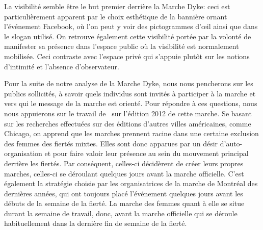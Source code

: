 La visibilité semble être le but premier derrière la Marche Dyke: ceci est particulièrement apparent par le choix esthétique de la bannière ornant l'événement Facebook, où l'on peut y voir des pictogrammes d'œil ainsi que dans le slogan utilisé.
On retrouve également cette visibilité portée par la volonté de manifester sa présence dans l'espace public où la visibilité est normalement mobilisée.
Ceci contraste avec l'espace privé qui s'appuie plutôt sur les notions d'intimité et l'absence d'observateur.

Pour la suite de notre analyse de la Marche Dyke, nous nous pencherons sur les publics sollicités, à savoir quels individus sont invités à participer à la marche et vers qui le message de la marche est orienté.
Pour répondre à ces questions, nous nous appuierons sur le travail de~\cite{Podmore2015a} sur l'édition 2012 de cette marche.
Se basant sur les recherches effectuées sur des éditions d'autres villes américaines, comme Chicago, on apprend que les marches \dykes{} prennent racine dans une certaine exclusion des femmes des fiertés mixtes.
Elles sont donc apparues par un désir d'auto-organisation et pour faire valoir leur présence au sein du mouvement principal derrière les fiertés.
Par conséquent, celles-ci décidèrent de créer leurs propres marches, celles-ci se déroulant quelques jours avant la marche officielle.
C'est également la stratégie choisie par les organisatrices de la marche de Montréal des dernières années, qui ont toujours placé l'événement quelques jours avant les débuts de la semaine de la fierté.
La marche des femmes quant à elle se situe durant la semaine de travail, donc, avant la marche officielle qui se déroule habituellement dans la dernière fin de semaine de la fierté.

